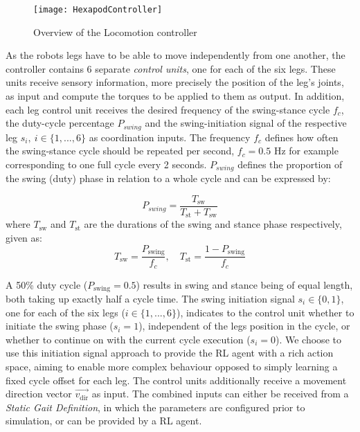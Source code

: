 \begin{figure}[h]
	\centerline{\texttt{[image: HexapodController]}}
	\caption[Controller Overview]{Overview of the Locomotion controller}
	\label{figure: Controller Overview}
\end{figure}

As the robots legs have to be able to move independently from one another, the controller contains 6 separate \textit{control units}, one for each of the six legs.
These units receive sensory information, more precisely the position of the leg's joints, as input and compute the torques to be applied to them as output.
In addition, each leg control unit receives the desired frequency of the swing-stance cycle $f_{c}$, the duty-cycle percentage $P_{swing}$ and the swing-initiation signal of the respective leg $s_i,\ i \in \{1,...,6\}$ as coordination inputs.
The frequency $f_{c}$ defines how often the swing-stance cycle should be repeated per second, $f_{c} = 0.5 \text{ Hz}$ for example corresponding to one full cycle every 2 seconds.
$P_{swing}$ defines the proportion of the swing (duty) phase in relation to a whole cycle \parencite{qiu2023adaptive} and can be expressed by: 

\begin{equation}
P_{swing} = \frac{T_\text{sw}} {T_\text{st} + T_\text{sw}}
\end{equation}
where $T_\text{sw}$ and $T_\text{st}$ are the durations of the swing and stance phase respectively, given as:
\begin{equation}
T_\text{sw} = \frac{P_\text{swing}}{f_c}, \quad T_\text{st} = \frac{1-P_\text{swing}}{f_c}
\end{equation}

A 50\% duty cycle ($P_{\text{swing}} = 0.5$) results in swing and stance being of equal length, both taking up exactly half a cycle time.
The swing initiation signal $s_i \in \{0,1\}$, one for each of the six legs ($i \in \{1,...,6\}$), indicates to the control unit whether to initiate the swing phase ($s_i = 1$), independent of the legs position in the cycle, or whether to continue on with the current cycle execution ($s_i = 0$).
We choose to use this initiation signal approach to provide the RL agent with a rich action space, aiming to enable more complex behaviour opposed to simply learning a fixed cycle offset for each leg.
The control units additionally receive a movement direction vector $\vec{v_\text{dir}}$ as input.
The combined inputs can either be received from a \textit{Static Gait Definition}, in which the parameters are configured prior to simulation, or can be provided by a RL agent.

